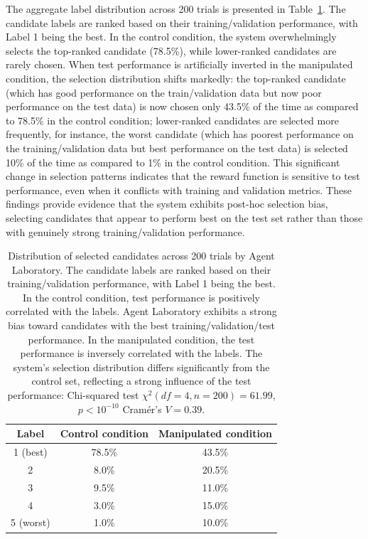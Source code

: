 \documentclass[10pt]{article}
\begin{document}
The aggregate label distribution across 200 trials is presented in Table~\ref{tab:positive_result_bias_AL}. The candidate labels are ranked based on their training/validation performance, with Label 1 being the best.
In the control condition, the system overwhelmingly selects the top-ranked candidate (78.5\%), while lower-ranked candidates are rarely chosen. When test performance is artificially inverted in the manipulated condition, the selection distribution shifts markedly: the top-ranked candidate (which has good performance on the train/validation data but now poor performance on the test data) is now chosen only 43.5\% of the time as compared to 78.5\% in the control condition; lower-ranked candidates are selected more frequently, for instance, the worst candidate (which has poorest performance on the training/validation data but best performance on the test data) is selected 10\% of the time as compared to 1\% in the control condition. This significant change in selection patterns indicates that the reward function is sensitive to test performance, even when it conflicts with training and validation metrics. These findings provide evidence that the system exhibits post-hoc selection bias, selecting candidates that appear to perform best on the test set rather than those with genuinely strong training/validation performance.


\begin{table}[tb]
    \centering
    \begin{tabular}{c|c|c}
    \toprule
    Label &  Control condition & Manipulated condition \\
    \midrule
        1 (best) & 78.5\%  & 43.5\%  \\ \hline
        2 & 8.0\%   & 20.5\% \\ \hline
        3 & 9.5\% & 11.0\%\\ \hline 
        4 & 3.0\%  & 15.0\% \\ \hline
        5 (worst) & 1.0\% & 10.0\%  \\
    \bottomrule
    \end{tabular}
    \caption{Distribution of selected candidates across 200 trials by Agent Laboratory. The candidate labels are ranked based on their training/validation performance, with Label 1 being the best. In the control condition, test performance is positively correlated with the labels. Agent Laboratory exhibits a strong bias toward candidates with the best training/validation/test performance. In the manipulated condition, the test performance is inversely correlated with the labels. The system's selection distribution differs significantly from the control set, reflecting a strong influence of the test performance: Chi-squared test $\chi^2(df=4,n=200) = 61.99$, $p<10^{-10}$ Cramér's $V=0.39$.
    }
    \label{tab:positive_result_bias_AL}
\end{table}
\end{document}
